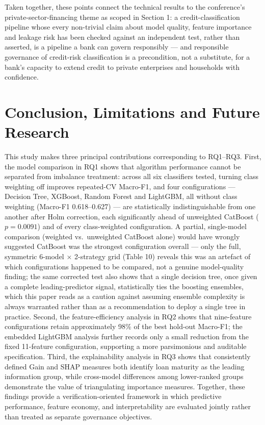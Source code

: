 \documentclass[11pt,a4paper]{article}
\begin{document}
Taken together, these points connect the technical results to the conference's private-sector-financing theme as scoped in Section 1: a credit-classification pipeline whose every non-trivial claim about model quality, feature importance and leakage risk has been checked against an independent test, rather than asserted, is a pipeline a bank can govern responsibly --- and responsible governance of credit-risk classification is a precondition, not a substitute, for a bank's capacity to extend credit to private enterprises and households with confidence.

\section{Conclusion, Limitations and Future Research}

This study makes three principal contributions corresponding to RQ1--RQ3. First, the model comparison in RQ1 shows that algorithm performance cannot be separated from imbalance treatment: across all six classifiers tested, turning class weighting off improves repeated-CV Macro-F1, and four configurations --- Decision Tree, XGBoost, Random Forest and LightGBM, all without class weighting (Macro-F1 0.618--0.627) --- are statistically indistinguishable from one another after Holm correction, each significantly ahead of unweighted CatBoost ($p=0.0091$) and of every class-weighted configuration. A partial, single-model comparison (weighted vs.\ unweighted CatBoost alone) would have wrongly suggested CatBoost was the strongest configuration overall --- only the full, symmetric 6-model $\times$ 2-strategy grid (Table 10) reveals this was an artefact of which configurations happened to be compared, not a genuine model-quality finding; the same corrected test also shows that a single decision tree, once given a complete leading-predictor signal, statistically ties the boosting ensembles, which this paper reads as a caution against assuming ensemble complexity is always warranted rather than as a recommendation to deploy a single tree in practice. Second, the feature-efficiency analysis in RQ2 shows that nine-feature configurations retain approximately 98\% of the best hold-out Macro-F1; the embedded LightGBM analysis further records only a small reduction from the fixed 11-feature configuration, supporting a more parsimonious and auditable specification. Third, the explainability analysis in RQ3 shows that consistently defined Gain and SHAP measures both identify loan maturity as the leading information group, while cross-model differences among lower-ranked groups demonstrate the value of triangulating importance measures. Together, these findings provide a verification-oriented framework in which predictive performance, feature economy, and interpretability are evaluated jointly rather than treated as separate governance objectives.
\end{document}
